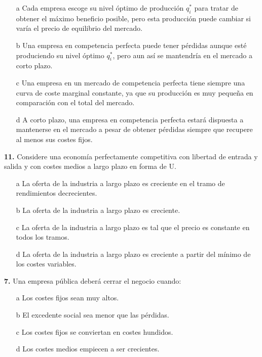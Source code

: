 \documentclass{nuevotema}
\begin{document}
\begin{itemize}
	\item[a] Cada empresa escoge su nivel óptimo de producción $q_i^*$ para tratar de obtener el máximo beneficio posible, pero esta producción puede cambiar si varía el precio de equilibrio del mercado.
	\item[b] Una empresa en competencia perfecta puede tener pérdidas aunque esté produciendo su nivel óptimo $q_i^*$, pero aun así se mantendría en el mercado a corto plazo.
	\item[c] Una empresa en un mercado de competencia perfecta tiene siempre una curva de coste marginal constante, ya que su producción es muy pequeña en comparación con el total del mercado.
	\item[d] A corto plazo, una empresa en competencia perfecta estará dispuesta a mantenerse en el mercado a pesar de obtener pérdidas siempre que recupere al menos sus costes fijos.
\end{itemize}


\textbf{11.} Considere una economía perfectamente competitiva con libertad de entrada y salida y con costes medios a largo plazo en forma de U.

\begin{itemize}
	\item[a] La oferta de la industria a largo plazo es creciente en el tramo de rendimientos decrecientes.
	\item[b] La oferta de la industria a largo plazo es creciente.
	\item[c] La oferta de la industria a largo plazo es tal que el precio es constante en todos los tramos.
	\item[d] La oferta de la industria a largo plazo es creciente a partir del mínimo de los costes variables. 
\end{itemize}


\textbf{7.} Una empresa pública deberá cerrar el negocio cuando:

\begin{itemize}
	\item[a] Los costes fijos sean muy altos.
	\item[b] El excedente social sea menor que las pérdidas.
	\item[c] Los costes fijos se conviertan en costes hundidos.
	\item[d] Los costes medios empiecen a ser crecientes.
\end{itemize}
\end{document}
